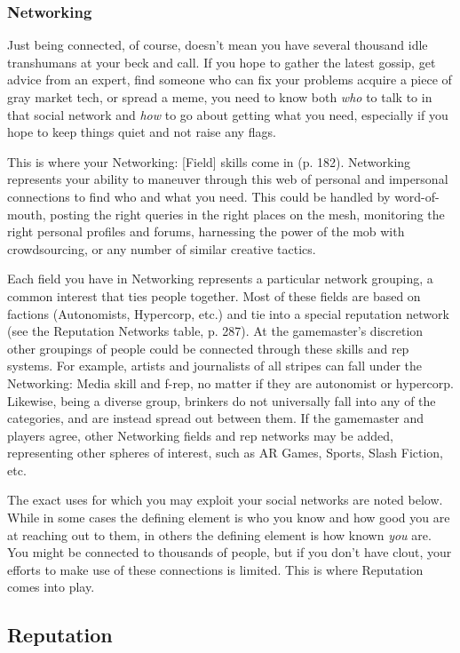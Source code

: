 \subsubsection{Networking} 

Just being connected, of course, doesn't mean you have several thousand idle transhumans at your beck and call. If you hope to gather the latest gossip, get advice from an expert, find someone who can fix your problems acquire a piece of gray market tech, or spread a meme, you need to know both \textit{who} to talk to in that social network and \textit{how} to go about getting what you need, especially if you hope to keep things quiet and not raise any flags. 

This is where your Networking: [Field] skills come in (p. 182). Networking represents your ability to maneuver through this web of personal and impersonal connections to find who and what you need. This could be handled by word-of-mouth, posting the right queries in the right places on the mesh, monitoring the right personal profiles and forums, harnessing the power of the mob with crowdsourcing, or any number of similar creative tactics. 

Each field you have in Networking represents a particular network grouping, a common interest that ties people together. Most of these fields are based on factions (Autonomists, Hypercorp, etc.) and tie into a special reputation network (see the Reputation Networks table, p. 287). At the gamemaster's discretion other groupings of people could be connected through these skills and rep systems. For example, artists and journalists of all stripes can fall under the Networking: Media skill and f-rep, no matter if they are autonomist or hypercorp. Likewise, being a diverse group, brinkers do not universally fall into any of the categories, and are instead spread out between them. If the gamemaster and players agree, other Networking fields and rep networks may be added, representing other spheres of interest, such as AR Games, Sports, Slash Fiction, etc. 

The exact uses for which you may exploit your social networks are noted below. While in some cases the defining element is who you know and how good you are at reaching out to them, in others the defining element is how known \textit{you} are. You might be connected to thousands of people, but if you don't have clout, your efforts to make use of these connections is limited. This is where Reputation comes into play. 

\subsection{Reputation} 

